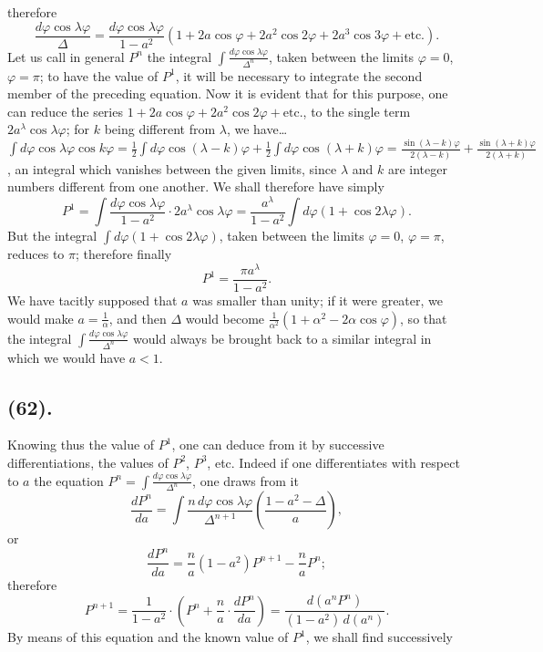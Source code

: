 \documentclass{article}
\begin{document}
therefore
\[ \frac{d\varphi\cos\lambda\varphi}{\Delta}=\frac{d\varphi\cos\lambda\varphi}{1-a^{2}}(1+2a\cos\varphi+2a^{2}\cos2\varphi+2a^{3}\cos3\varphi+\text{etc.}). \]
Let us call in general $P^{n}$ the integral $\displaystyle\int\frac{d\varphi\cos\lambda\varphi}{\Delta^{n}}$, taken between the limits $\varphi=0$, $\varphi=\pi$; to have the value of $P^{1}$, it will be necessary to integrate the second member of the preceding equation. Now it is evident that for this purpose, one can reduce the series $1+2a\cos\varphi+2a^{2}\cos2\varphi+\text{etc.}$, to the single term $2a^{\lambda}\cos\lambda\varphi$; for $k$ being different from $\lambda$, we have\ldots\ $\displaystyle\int d\varphi\cos\lambda\varphi\cos k\varphi=\frac{1}{2}\int d\varphi\cos(\lambda-k)\varphi+\frac{1}{2}\int d\varphi\cos(\lambda+k)\varphi=\frac{\sin(\lambda-k)\varphi}{2(\lambda-k)}+\frac{\sin(\lambda+k)\varphi}{2(\lambda+k)}$, an integral which vanishes between the given limits, since $\lambda$ and $k$ are integer numbers different from one another. We shall therefore have simply
\[ P^{1}=\int\frac{d\varphi\cos\lambda\varphi}{1-a^{2}}\cdot2a^{\lambda}\cos\lambda\varphi=\frac{a^{\lambda}}{1-a^{2}}\int d\varphi(1+\cos2\lambda\varphi). \]
But the integral $\displaystyle\int d\varphi(1+\cos2\lambda\varphi)$, taken between the limits $\varphi=0$, $\varphi=\pi$, reduces to $\pi$; therefore finally
\[ P^{1}=\frac{\pi a^{\lambda}}{1-a^{2}}. \tag{1} \]
We have tacitly supposed that $a$ was smaller than unity; if it were greater, we would make $a=\frac{1}{\alpha}$, and then $\Delta$ would become $\frac{1}{\alpha^{2}}(1+\alpha^{2}-2\alpha\cos\varphi)$, so that the integral $\displaystyle\int\frac{d\varphi\cos\lambda\varphi}{\Delta^{n}}$ would always be brought back to a similar integral in which we would have $a<1$.

\subsection*{(62).}

Knowing thus the value of $P^{1}$, one can deduce from it by successive differentiations, the values of $P^{2}$, $P^{3}$, etc. Indeed if one differentiates with respect to $a$ the equation $\displaystyle P^{n}=\int\frac{d\varphi\cos\lambda\varphi}{\Delta^{n}}$, one draws from it
\[ \frac{dP^{n}}{da}=\int\frac{n\,d\varphi\cos\lambda\varphi}{\Delta^{n+1}}\left(\frac{1-a^{2}-\Delta}{a}\right), \]
or
\[ \frac{dP^{n}}{da}=\frac{n}{a}(1-a^{2})P^{n+1}-\frac{n}{a}P^{n}; \]
therefore
\[ P^{n+1}=\frac{1}{1-a^{2}}\cdot\left(P^{n}+\frac{n}{a}\cdot\frac{dP^{n}}{da}\right)=\frac{d(a^{n}P^{n})}{(1-a^{2})\,d(a^{n})}. \tag{2} \]
By means of this equation and the known value of $P^{1}$, we shall find successively
\end{document}

